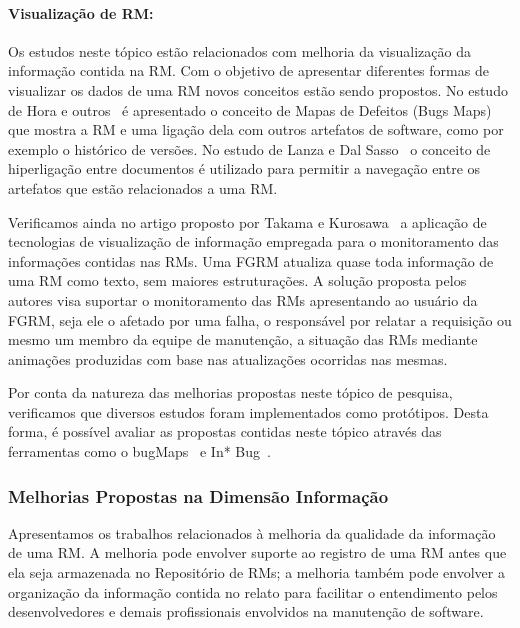 \paragraph{Visualização de RM:}

Os estudos neste tópico estão relacionados com melhoria da visualização da
informação contida na RM\@. Com o objetivo de apresentar diferentes formas de
visualizar os dados de uma RM novos conceitos estão sendo propostos. No estudo
de Hora e outros~\cite{hora2012bug} é apresentado o conceito de Mapas de
Defeitos (Bugs Maps) que mostra a RM e uma ligação dela com outros artefatos de
software, como por exemplo o histórico de versões.  No estudo de Lanza e  Dal
Sasso~\cite{dal2014bug} o conceito de hiperligação entre documentos é utilizado
para permitir a navegação entre os artefatos que estão relacionados a uma RM\@.

Verificamos ainda no artigo proposto por Takama e
Kurosawa~\cite{takama2013application} a aplicação de tecnologias de visualização
de informação empregada para o monitoramento das informações contidas nas RMs.
Uma FGRM atualiza quase toda informação de uma RM como texto, sem maiores
estruturações. A solução proposta pelos autores visa suportar o monitoramento
das RMs apresentando ao usuário da FGRM, seja ele o afetado por uma falha, o
responsável por relatar a requisição ou mesmo um membro da equipe de manutenção,
a situação das RMs mediante animações produzidas com base nas atualizações
ocorridas nas mesmas.

Por conta da natureza das melhorias propostas neste tópico de pesquisa,
verificamos que diversos estudos foram implementados como protótipos. Desta
forma, é possível avaliar as propostas contidas neste tópico através das
ferramentas como o bugMaps~\cite{hora2012bug} e In* Bug~\cite{dal2014bug}.

\subsubsection{Melhorias Propostas na Dimensão Informação}
\label{ssub:melhorias_dim_informacao}

Apresentamos os trabalhos relacionados à melhoria da qualidade da informação de
uma RM\@. A melhoria pode envolver suporte ao registro de uma RM antes que ela
seja armazenada no Repositório de RMs; a melhoria também pode envolver a
organização da informação contida no relato para facilitar o entendimento pelos
desenvolvedores e demais profissionais envolvidos na manutenção de software.

